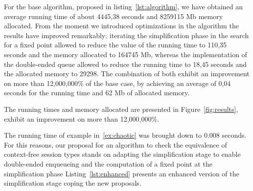 For the base algorithm, proposed in listing~\ref{lst:algorithm},
we have obtained an average running time of about 4445,38 seconds
and 8259115 Mb memory allocated. From the moment we introduced 
optimizations in the algorithm the results have improved remarkably:
iterating the simplification phase in the search for a fixed point 
allowed to reduce the value of the running time to 110,35 seconds and 
the memory allocated to 164745 Mb, whereas the implementation of the 
double-ended queue allowed to reduce the running time to 18,45 seconds 
and the allocated memory to 29298. The combination of both exhibit an 
improvement on more than 12,000,000\% of the base case, by 
achieving an average of 0,04 seconds for the running time and 62 Mb 
of allocated memory.

The running times and memory allocated are presented in
Figure~\ref{fig:results}, exhibit an improvement on more than
12,000,000\%. 

The running time of example in~\eqref{ex:chaotic} was
brought down to 0.008 seconds. For this reasons, our
proposal for an algorithm to check the equivalence of context-free
session types stands on adapting the simplification stage to enable
double-ended enqueueing and the computation of a fixed point at the
simplification phase Listing~\ref{lst:enhanced} presents an enhanced
version of the simplification stage coping the new proposals.



